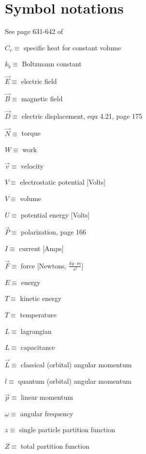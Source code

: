 \documentclass[12pt]{article}  %
\begin{document}
\newpage

\section{Symbol notations}

See page 631-642 of \cite{ReifThermo}

$C_v \equiv$ specific heat for constant volume

$k_b \equiv$ Boltzmann constant

$\vec{E} \equiv$ electric field

$\vec{B} \equiv$ magnetic field

$\vec{D} \equiv$ electric displacement, equ 4.21, page 175 \cite{GriffithED}

$\vec{N} \equiv$ torque

$W \equiv$ work

$\vec{v} \equiv$ velocity

$V \equiv$ electrostatic potential [Volts]

$V \equiv$ volume

$U \equiv$ potential energy [Volts]

$\vec{P} \equiv$ polarization, page 166 \cite{GriffithED}

$I \equiv$ current [Amps]

$\vec{F} \equiv$ force [Newtons, $\frac{kg \cdot m}{s^2}$]

$E \equiv$ energy

$T \equiv$ kinetic energy

$T \equiv$ temperature

$L \equiv$ lagrangian

$L \equiv$ capacitance

$\vec{L} \equiv$ classical (orbital) angular momentum

$l \equiv$ quantum (orbital) angular momentum

$\vec{p} \equiv$ linear momentum

$\omega \equiv$ angular frequency

$z \equiv$ single particle partition function

$Z \equiv$ total partition function
\end{document}
